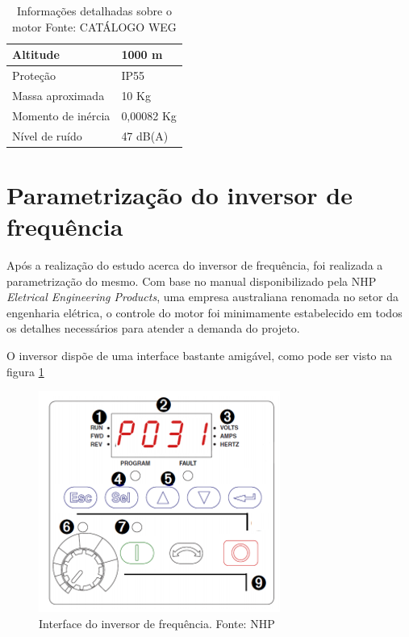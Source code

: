 \begin{table}[h]
\begin{center}
\begin{tabular}{|p{5cm}|p{5cm}|}
                Altitude & 1000 m
                \\ \hline
                Proteção & IP55
                \\ \hline
                Massa aproximada & 10 Kg
                \\ \hline
                Momento de inércia & 0,00082 Kg
                \\ \hline
                Nível de ruído & 47 dB(A)
                \\ \hline
              \end{tabular}
              \caption[Informações detalhadas sobre o motor]{Informações detalhadas sobre o motor
              \protect Fonte: CATÁLOGO WEG }
            \label{tabela_info_motor}
        \end{center}
    \end{table}


\section{Parametrização do inversor de frequência}

Após a realização do estudo acerca do inversor de frequência, foi realizada a parametrização do mesmo. Com base no manual disponibilizado pela NHP \textit{Eletrical Engineering Products}, uma empresa australiana renomada no setor da engenharia elétrica, o controle do motor foi minimamente estabelecido em todos os detalhes necessários para atender a demanda do projeto.

O inversor dispõe de uma interface bastante amigável, como pode ser visto na figura \ref{Interface do inversor}

\begin{figure}[h!]
	\centering
		\includegraphics[keepaspectratio=true,scale=0.6]{figuras/interface_inversor.png}
	\caption{Interface do inversor de frequência. Fonte: NHP}
    \label{Interface do inversor}
\end{figure}

